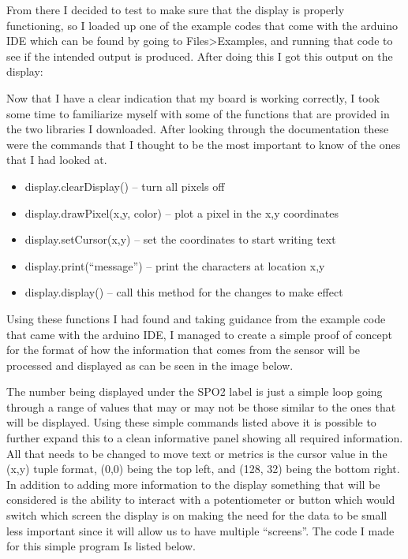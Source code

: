 \documentclass{article}
\begin{document}
From there I decided to test to make sure that the display is properly functioning, so I loaded up one of the example codes that come with the arduino IDE which can be found by going to Files>Examples, and running that code to see if the intended output is produced. After doing this I got this output on the display:
\begin{center}
\end{center}
Now that I have a clear indication that my board is working correctly, I took some time to familiarize myself with some of the functions that are provided in the two libraries I downloaded. After looking through the documentation these were the commands that I thought to be the most important to know of the ones that I had looked at.
\begin{itemize}
    \item display.clearDisplay() –  turn all pixels off
    \item display.drawPixel(x,y, color) – plot a pixel in the x,y coordinates
    \item display.setCursor(x,y) – set the coordinates to start writing text
    \item display.print(“message”) – print the characters at location x,y
    \item display.display() – call this method for the changes to make effect
\end{itemize}
Using these functions I had found and taking guidance from the example code that came with the arduino IDE, I managed to create a simple proof of concept for the format of how the information that comes from the sensor will be processed and displayed as can be seen in the image below.
\begin{center}
\end{center}
The number being displayed under the SPO2 label is just a simple loop going through a range of values that may or may not be those similar to the ones that will be displayed. Using these simple commands listed above it is possible to further expand this to a clean informative panel showing all required information. All that needs to be changed to move text or metrics is the cursor value in the (x,y) tuple format, (0,0) being the top left, and (128, 32) being the bottom right. In addition to adding more information to the display something that will be considered is the ability to interact with a potentiometer or button which would switch which screen the display is on making the need for the data to be small less important since it will allow us to have multiple “screens”. The code I made for this simple program Is listed below.
\end{document}
